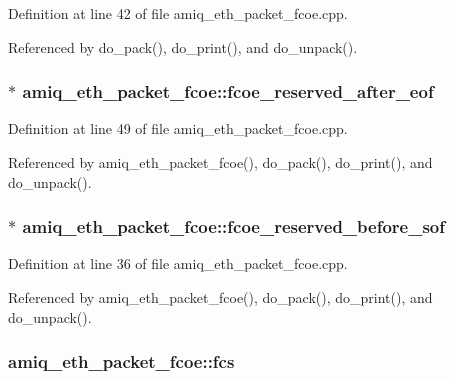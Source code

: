 Definition at line 42 of file amiq\_\-eth\_\-packet\_\-fcoe.cpp.

Referenced by do\_\-pack(), do\_\-print(), and do\_\-unpack().\hypertarget{classamiq__eth__packet__fcoe_a266138e5bb3e111d68da8d3c1e22f562}{
\subsubsection[{fcoe\_\-reserved\_\-after\_\-eof}]{$\ast$ {\bf amiq\_\-eth\_\-packet\_\-fcoe::fcoe\_\-reserved\_\-after\_\-eof}}}
\label{classamiq__eth__packet__fcoe_a266138e5bb3e111d68da8d3c1e22f562}


Definition at line 49 of file amiq\_\-eth\_\-packet\_\-fcoe.cpp.

Referenced by amiq\_\-eth\_\-packet\_\-fcoe(), do\_\-pack(), do\_\-print(), and do\_\-unpack().\hypertarget{classamiq__eth__packet__fcoe_a12c47cb7c8c88a33452e77cc939a537e}{
\subsubsection[{fcoe\_\-reserved\_\-before\_\-sof}]{$\ast$ {\bf amiq\_\-eth\_\-packet\_\-fcoe::fcoe\_\-reserved\_\-before\_\-sof}}}
\label{classamiq__eth__packet__fcoe_a12c47cb7c8c88a33452e77cc939a537e}


Definition at line 36 of file amiq\_\-eth\_\-packet\_\-fcoe.cpp.

Referenced by amiq\_\-eth\_\-packet\_\-fcoe(), do\_\-pack(), do\_\-print(), and do\_\-unpack().\hypertarget{classamiq__eth__packet__fcoe_a487ea28eaec60b68c048d93908c304ff}{
\subsubsection[{fcs}]{ {\bf amiq\_\-eth\_\-packet\_\-fcoe::fcs}}}
\label{classamiq__eth__packet__fcoe_a487ea28eaec60b68c048d93908c304ff}


